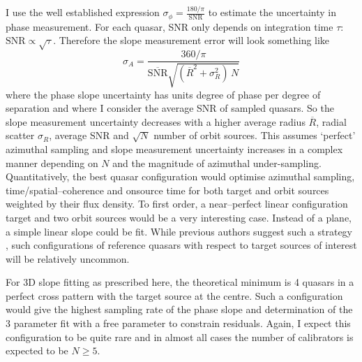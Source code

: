 		I use the well established expression $\sigma_\phi=\frac{180/\pi}{\text{SNR}}$ to estimate the uncertainty in phase measurement. For each quasar, SNR only depends on integration time $\tau$: $\text{SNR}\propto\sqrt{\tau}$. Therefore the slope measurement error will look something like
		\begin{equation}
			\sigma_{A} = \frac{360/\pi}{\overline{\text{SNR}}\sqrt{\left(\overline{R}^2+\sigma_R^2\right)\,N}} 
			\label{eq:slopeerror}
		\end{equation} where the phase slope uncertainty has units degree of phase per degree of separation and where I consider the average SNR of sampled quasars. So the slope measurement uncertainty decreases with a higher average radius $\overline{R}$, radial scatter $\sigma_R$, average SNR and $\sqrt{N}$ number of orbit sources. This assumes `perfect' azimuthal sampling and slope measurement uncertainty increases in a complex manner depending on $N$ and the magnitude of azimuthal under-sampling. Quantitatively, the best quasar configuration would optimise azimuthal sampling, time/spatial--coherence and onsource time for both target and orbit sources weighted by their flux density. To first order, a near--perfect linear configuration target and two orbit sources would be a very interesting case. Instead of a plane, a simple linear slope could be fit. While previous authors suggest such a strategy \citep{Reid2017}, such configurations of reference quasars with respect to target sources of interest will be relatively uncommon.
		
		For 3D slope fitting as prescribed here, the theoretical minimum is 4 quasars in a perfect cross pattern with the target source at the centre. Such a configuration would give the highest sampling rate of the phase slope and determination of the 3 parameter fit with a free parameter to constrain residuals. Again, I expect this configuration to be quite rare and in almost all cases the number of calibrators is expected to be $N\ge5$. %
	
